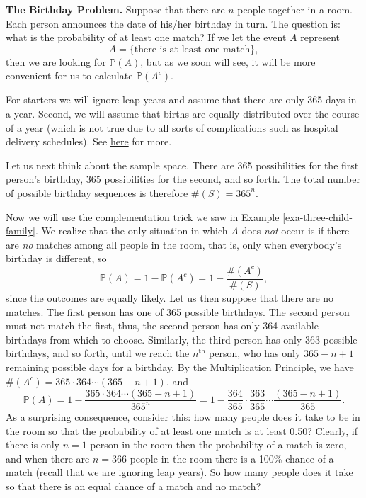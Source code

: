 \textbf{The Birthday Problem.} Suppose that there are \(n\) people together
in a room. Each person announces the date of his/her birthday in
turn. The question is: what is the probability of at least one match?
If we let the event \(A\) represent \[ A = \{ \mbox{there is at least
one match}\}, \] then we are looking for \(\mathbb{P}(A)\), but as we
soon will see, it will be more convenient for us to calculate
\(\mathbb{P}(A^{c})\).

For starters we will ignore leap years and assume that there are only
365 days in a year. Second, we will assume that births are equally
distributed over the course of a year (which is not true due to all
sorts of complications such as hospital delivery schedules). See \href{http://en.wikipedia.org/wiki/Birthday_problem}{here}
for more.

Let us next think about the sample space. There are 365 possibilities
for the first person's birthday, 365 possibilities for the second, and
so forth. The total number of possible birthday sequences is therefore
\(\#(S)=365^{n}\).

Now we will use the complementation trick we saw in Example \ref{exa-three-child-family}. We realize that the only situation in which \(A\) does
\emph{not} occur is if there are \emph{no} matches among all people in the room,
that is, only when everybody's birthday is different, so \[
\mathbb{P}(A)=1-\mathbb{P}(A^{c})=1-\frac{\#(A^{c})}{\#(S)}, \] since
the outcomes are equally likely. Let us then suppose that there are no
matches. The first person has one of 365 possible birthdays. The
second person must not match the first, thus, the second person has
only 364 available birthdays from which to choose. Similarly, the
third person has only 363 possible birthdays, and so forth, until we
reach the \(n^{\mathrm{th}}\) person, who has only \(365-n+1\)
remaining possible days for a birthday. By the Multiplication
Principle, we have \(\#(A^{c})=365\cdot364\cdots(365-n+1)\), and
\begin{equation}
\mathbb{P}(A)=1-\frac{365\cdot364\cdots(365-n+1)}{365^{n}}=1-\frac{364}{365}\cdot\frac{363}{365}\cdots\frac{(365-n+1)}{365}.
\end{equation}
As a surprising consequence, consider this: how many people does it
take to be in the room so that the probability of at least one match
is at least 0.50? Clearly, if there is only \(n=1\) person in the room
then the probability of a match is zero, and when there are \(n=366\)
people in the room there is a 100\% chance of a match (recall that we
are ignoring leap years). So how many people does it take so that
there is an equal chance of a match and no match?

